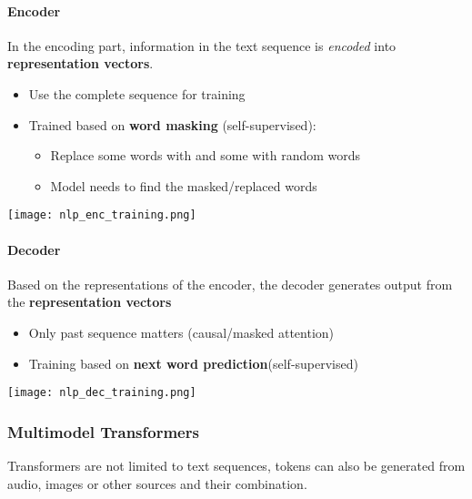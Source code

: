 \paragraph{Encoder}
In the encoding part, information in the text sequence is \textit{encoded} into \textbf{representation vectors}.
\newpar{}
\begin{itemize}
    \item Use the complete sequence for training
    \item Trained based on \textbf{word masking} (self-supervised):
          \begin{itemize}
              \item Replace some words with  and some with random words
              \item Model needs to find the masked/replaced words
          \end{itemize}
\end{itemize}
\begin{center}
    \texttt{[image: nlp\_enc\_training.png]}
\end{center}


\paragraph{Decoder}

Based on the representations of the encoder, the decoder generates output from the \textbf{representation vectors}
\newpar{}
\begin{itemize}
    \item Only past sequence matters (causal/masked attention)
    \item Training based on \textbf{next word prediction}\newline (self-supervised)
\end{itemize}
\begin{center}
    \texttt{[image: nlp\_dec\_training.png]}
\end{center}

\subsubsection{Multimodel Transformers}
Transformers are not limited to text sequences, tokens can also be generated from audio, images or other sources and their combination.

